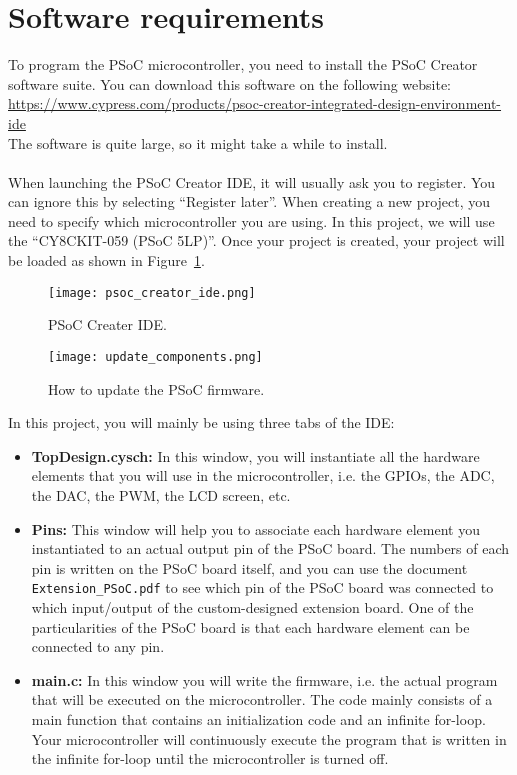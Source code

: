 \section{Software requirements}

To program the PSoC microcontroller, you need to install the PSoC Creator software suite. You can download this software on the following website: \\
\url{https://www.cypress.com/products/psoc-creator-integrated-design-environment-ide}\\
The software is quite large, so it might take a while to install. 
\\
\\
When launching the PSoC Creator IDE, it will usually ask you to register. You can ignore this by selecting ``Register later''. When creating a new project, you need to specify which microcontroller you are using. In this project, we will use the ``CY8CKIT-059 (PSoC 5LP)''. Once your project is created, your project will be loaded as shown in Figure~\ref{fig:psoc_creator_ide}. 
\begin{figure}[h]
	\centering
	\texttt{[image: psoc\_creator\_ide.png]}
	\caption{PSoC Creater IDE. }
	\label{fig:psoc_creator_ide}
\end{figure}
\begin{figure}[h]
	\centering
	\texttt{[image: update\_components.png]}
	\caption{How to update the PSoC firmware. }
	\label{fig:update_components}
\end{figure}

In this project, you will mainly be using three tabs of the IDE: 
\begin{itemize}
	\item \textbf{TopDesign.cysch: } In this window, you will instantiate all the hardware elements that you will use in the microcontroller, i.e. the GPIOs, the ADC, the DAC, the PWM, the LCD screen, etc. 
	\item \textbf{Pins: } This window will help you to associate each hardware element you instantiated to an actual output pin of the PSoC board. The numbers of each pin is written on the PSoC board itself, and you can use the document \texttt{Extension\_PSoC.pdf} to see which pin of the PSoC board was connected to which input/output of the custom-designed extension board. One of the particularities of the PSoC board is that each hardware element can be connected to any pin. 
	\item \textbf{main.c: } In this window you will write the firmware, i.e. the actual program that will be executed on the microcontroller. The code mainly consists of a main function that contains an initialization code and an infinite for-loop. Your microcontroller will continuously execute the program that is written in the infinite for-loop until the microcontroller is turned off.  
\end{itemize}

